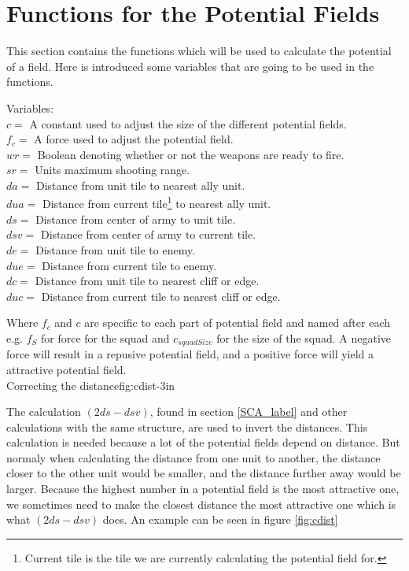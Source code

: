 \section{Functions for the Potential Fields}
	This section contains the functions which will be used to calculate the potential of a field. Here is introduced some variables that 
	are going to be used in the functions.
	
	\label{cha3_variables}
	Variables:\\
	$c =$ A constant used to adjust the size of the different potential fields.\\ 
	$f_c =$ A force used to adjust the potential field.\\
	$wr =$ Boolean denoting whether or not the weapons are ready to fire.\\
	$sr =$ Units maximum shooting range.\\
	$da =$ Distance from unit tile to nearest ally unit.\\
	$dua =$ Distance from current tile\footnote{Current tile is the tile we are currently calculating the potential field for.} to nearest ally unit.\\
	$ds =$ Distance from center of army to unit tile.\\
	$dsv =$ Distance from center of army to current tile.\\
	$de =$ Distance from unit tile to enemy.\\
	$due =$ Distance from current tile to enemy.\\
	$dc =$ Distance from unit tile to nearest cliff or edge. \\
	$duc =$ Distance from current tile to nearest cliff or edge. 
	
	
	
	Where $f_c$ and $c$ are specific to each part of potential field and named after each e.g. $f_{S}$ for force for the squad and $c_{squadSize}$ for the size of the squad. A negative force will result in a repusive potential field, and a positive force will yield a attractive potential field.\\
	
		    {Correcting the distance}{fig:cdist}{-3in}
			
	The calculation $(2ds - dsv)$, found in section \ref{SCA_label} and other calculations with the same structure, are used to invert the distances. This calculation is needed because a lot of the potential fields depend on distance. But normaly when calculating the distance from one unit to another, the distance closer to the other unit would be smaller, and the distance further away would be larger. Because the highest number in a potential field is the most attractive one, we sometimes need to make the closest distance the most attractive one which is what $(2ds - dsv)$ does. An example can be seen in figure \ref{fig:cdist}
	
